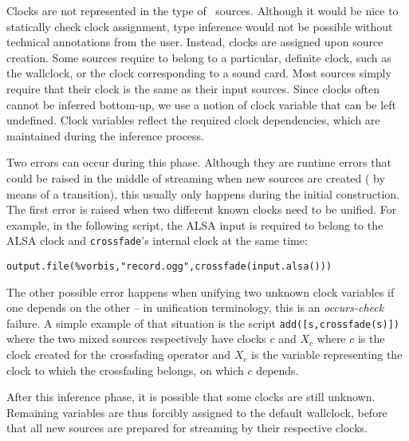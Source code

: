 Clocks are not represented in the type of \liquidsoap\ sources.
Although it would be nice to statically check clock assignment,
type inference would not be possible without technical annotations
from the user. Instead, clocks are assigned upon source creation.
Some sources require to belong to a particular, definite clock,
such as the wallclock, or the clock corresponding to a sound card.
Most sources simply require that their clock is the same as their
input sources.
Since clocks often cannot be inferred bottom-up, we use a notion
of clock variable that can be left undefined.
Clock variables reflect the required clock dependencies,
which are maintained during the inference process.

Two errors can occur during this phase.
Although they are runtime errors that could be raised
in the middle of streaming when new sources are created
(\eg{} by means of a transition),
this usually only happens during the initial construction.
The first error is raised when
two different known clocks need to be unified.
For example, in the following script, the ALSA input is
required to belong to the ALSA clock and \verb.crossfade.'s internal clock
at the same time:
\begin{verbatim}
output.file(%vorbis,"record.ogg",crossfade(input.alsa()))
\end{verbatim}
The other possible error happens when unifying two unknown clock variables
if one depends on the other -- in unification terminology, this is an
\emph{occurs-check} failure. A simple example of that situation is
the script \verb.add([s,crossfade(s)]). where the two mixed sources
respectively have clocks $c$ and $X_c$ where $c$ is the clock created
for the crossfading operator and $X_c$ is the variable representing
the clock to which the crossfading belongs, on which $c$ depends.

After this inference phase, it is possible that some clocks are still
unknown. Remaining variables are thus forcibly assigned to the default
wallclock, before that all new sources are prepared for streaming
by their respective clocks.

